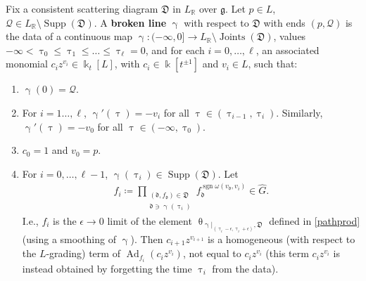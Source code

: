 \documentclass{amsart}
\DeclareMathOperator{\sign}{sgn}
\DeclareMathOperator{\Joints}{Joints}
\DeclareMathOperator{\Supp}{Supp}
\DeclareMathOperator{\Ad}{Ad}
\let\bb=\mathbb
\let\rar=\rightarrow
\let\f=\mathfrak
\newcommand {\kk} {\Bbbk}
\newcommand {\sQ} {\mathcal{Q}}
\renewcommand{\theta}{\uptheta}
\renewcommand{\gamma}{\upgamma}
\renewcommand{\tau}{\uptau}
\theoremstyle{plain}%
\theoremstyle{definition}
\theoremstyle{remark}
\begin{document}
Fix a consistent scattering diagram $\f{D}$ in $L_{\bb{R}}$ over $\f{g}$.  Let $p\in L$, $\sQ\in L_{\bb{R}}\setminus \Supp(\f{D})$.  A \textbf{broken line} $\gamma$ with respect to $\f{D}$ with  ends $(p,\sQ)$ is the data of a continuous map $\gamma\colon (-\infty,0]\rar L_{\bb{R}}\setminus \Joints(\f{D})$, values $-\infty < \tau_0 \leq \tau_1 \leq \ldots \leq \tau_{\ell} = 0$, and for each $i=0,\ldots,\ell$, an associated monomial $c_iz^{v_i} \in  \kk_t[L]$, with $c_i\in \kk[t^{\pm 1}]$ and $v_i\in L$, such that:
\begin{enumerate}[label=(\roman*), noitemsep]
\item $\gamma(0)=\sQ$.
\item For $i=1\ldots, \ell$, $\gamma'(\tau)=-v_i$ for all $\tau\in (\tau_{i-1},\tau_{i})$.  Similarly, $\gamma'(\tau)=-v_0$ for all $\tau\in (-\infty,\tau_0)$. 
\item $c_0=1$ and $v_0=p$.
\item For $i=0,\ldots,\ell-1$, $\gamma(\tau_i)\in \Supp(\f{D})$.  Let 
\begin{align}\label{fi}
f_i\coloneqq \prod_{\substack{(\f{d},f_{\f{d}})\in \f{D} \\ \f{d}\ni \gamma(\tau_i)}} f_{\f{d}}^{\sign\omega(v_{\f{d}},v_i)} \in \hat{G}.
\end{align}
I.e., $f_i$ is the $\epsilon\rar 0$ limit of the element $\theta_{\gamma|_{(\tau_i-\epsilon,\tau_i+\epsilon)},\f{D}}$ defined in \eqref{pathprod} (using a smoothing of $\gamma$). Then $c_{i+1}z^{v_{i+1}}$ is a homogeneous (with respect to the $L$-grading) term of $\Ad_{f_i}(c_iz^{v_i})$, not equal to $c_iz^{v_i}$ (this term $c_iz^{v_i}$ is instead obtained by forgetting the time $\tau_i$ from the data).
\end{enumerate}
\end{document}

